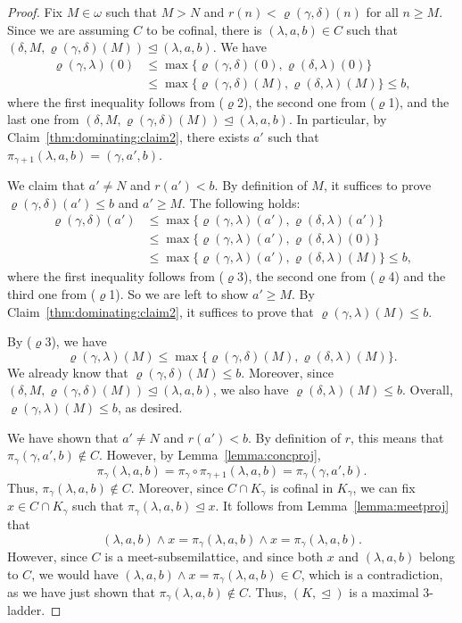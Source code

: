 \documentclass[]{amsart}
\theoremstyle{definition}
\theoremstyle{remark}
\begin{document}
\begin{proof}
Fix $M \in \omega$ such that $M > N$ and $r(n) < \varrho(\gamma, \delta)(n)$ for all $n \ge M$. Since we are assuming $C$ to be cofinal, there is $(\lambda, a, b) \in C$ such that $(\delta, M, \varrho(\gamma, \delta)(M)) \trianglelefteq (\lambda, a, b)$. We have
\begin{align*}
\varrho(\gamma, \lambda)(0) &\le \max\{\varrho(\gamma, \delta)(0), \varrho(\delta, \lambda)(0)\}\\&\le \max\{\varrho(\gamma, \delta)(M), \varrho(\delta, \lambda)(M)\} \le b,
\end{align*}
where the first inequality follows from ($\varrho$2), the second one from ($\varrho$1), and the last one from $(\delta, M, \varrho(\gamma, \delta)(M)) \trianglelefteq (\lambda, a, b)$.
In particular, by Claim~\ref{thm:dominating:claim2}, there exists $a'$ such that $\pi_{\gamma+1} (\lambda, a, b) = (\gamma, a', b)$. 

We claim that $a' \neq N$ and $r(a') < b$. By definition of $M$, it suffices to prove $\varrho(\gamma, \delta)(a') \le b$ and $a' \ge M$. The following holds:
\begin{align*}
\varrho(\gamma, \delta)(a')  &\le \max \{\varrho(\gamma, \lambda)(a'), \varrho(\delta, \lambda)(a')\}\\&\le \max \{\varrho(\gamma, \lambda)(a'), \varrho(\delta, \lambda)(0)\}
\\&\le \max \{\varrho(\gamma, \lambda)(a'), \varrho(\delta, \lambda)(M)\} \le b,
\end{align*}
where the first inequality follows from ($\varrho$3), the second one from ($\varrho$4) and the third one from ($\varrho$1). So we are left to show $a' \ge M$. By Claim~\ref{thm:dominating:claim2}, it suffices to prove that $\varrho(\gamma, \lambda)(M) \le b$. 

By ($\varrho$3), we have
\[
\varrho(\gamma, \lambda)(M) \le \max\{\varrho(\gamma, \delta)(M), \varrho(\delta, \lambda)(M)\}.
\]
We already know that $\varrho(\gamma, \delta)(M) \le b$. Moreover, since $(\delta, M, \varrho(\gamma, \delta)(M)) \trianglelefteq (\lambda, a, b)$, we also have $\varrho(\delta, \lambda)(M) \le b$. Overall, $\varrho(\gamma, \lambda)(M)\le b$, as desired. 

We have shown that $a' \neq N$ and $r(a') < b$. By definition of $r$, this means that $\pi_\gamma (\gamma, a', b) \not\in C$. However, by Lemma~\ref{lemma:concproj}, 
\[
\pi_\gamma(\lambda, a, b) = \pi_\gamma \circ \pi_{\gamma+1}(\lambda, a, b) = \pi_\gamma (\gamma, a', b).
\] 
Thus, $\pi_\gamma(\lambda, a, b) \not\in C$. Moreover, since $C \cap K_\gamma$ is cofinal in $K_\gamma$, we can fix $x \in C \cap K_\gamma$ such that $\pi_\gamma (\lambda, a ,b)  \trianglelefteq x$. It follows from Lemma~\ref{lemma:meetproj} that 
\[
(\lambda, a, b) \wedge x = \pi_\gamma(\lambda, a, b) \wedge x = \pi_\gamma(\lambda, a, b).
\]
However, since $C$ is a meet-subsemilattice, and since both $x$ and $(\lambda, a, b)$ belong to $C$, we would have $(\lambda, a, b) \wedge x = \pi_\gamma(\lambda, a, b) \in C$, which is a contradiction, as we have just shown that $\pi_\gamma(\lambda, a, b) \not\in C$. Thus, $(K, \trianglelefteq)$ is  a maximal $3$-ladder. 


\end{proof}
\end{document}
